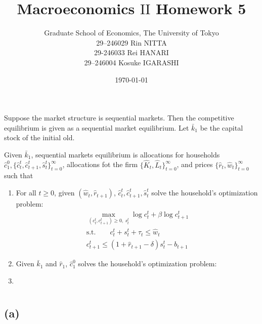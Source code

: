 \documentclass{ltjsarticle}
\title{Macroeconomics $\mathrm{II}$ Homework 5}
\date{\today}
\author{Graduate School of Economics, The University of Tokyo\\[4mm]29--246029 Rin NITTA\\ 29-246033 Rei HANARI \\ 29--246004 Kosuke IGARASHI}
\begin{document}
\maketitle

\section{} %

\section{} %

\section{} %

Suppose the market structure is sequential markets. Then the competitive equilibrium is given as a sequential market equilibrium.
Let $\bar{k}_1$ be the capital stock of the initial old. 

Given $\bar{k}_1$, sequential markets equilibrium is allocations for households $\hat{c}_1^0, \{\hat{c}_t^t, \hat{c}_{t+1}^t, \hat{s}_t^t \}_{t=0}^{\infty}$, allocations fot the firm $\{\hat{K}_t, \hat{L}_t\}_{t=0}^{\infty}$, and prices $\{\hat{r}_t, \hat{w}_t\}_{t=0}^{\infty}$ such that
\begin{enumerate}
  \item For all $t \geq 0$, given $(\hat{w}_t, \hat{r}_{t+1})$, $\hat{c}_t^t, \hat{c}_{t+1}^t, \hat{s}_t^t$ solve the household's optimization problem:
  \begin{gather*}
    \max_{(c_t^t, c_{t+1}^t) \geq 0, \: s_t^t} \log c_t^t + \beta \log c_{t+1}^t \\
    \text{s.t.} \qquad c_t^t + s_t^t + \tau_t \leq \hat{w}_t \\
    c_{t+1}^t \leq (1 + \hat{r}_{t+1} - \delta) s_t^t - b_{t+1}
  \end{gather*}
  \item Given $\bar{k}_1$ and $\hat{r}_1$, $\hat{c}_1^0$ solves the household's optimization problem:
  \item 
\end{enumerate}


\section{} %

\subsection*{(a)}
\end{document}
